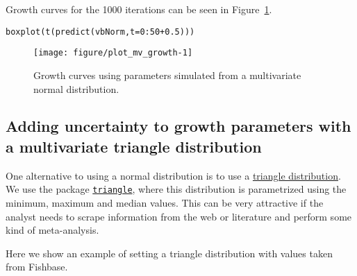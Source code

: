 \documentclass[a4paper,english,10pt]{article}\usepackage[]{graphicx}\usepackage[]{color}
\makeatletter
\def\maxwidth{ %
  \ifdim\Gin@nat@width>\linewidth
    \linewidth
  \else
    \Gin@nat@width
  \fi
}
\newcommand{\hlnum}[1]{\textcolor[rgb]{0.2,0.2,0.2}{#1}}%
\newcommand{\hlopt}[1]{\textcolor[rgb]{0.2,0.2,0.2}{#1}}%
\newcommand{\hlstd}[1]{\textcolor[rgb]{0,0,0}{#1}}%
\newcommand{\hlkwc}[1]{\textcolor[rgb]{0.361,0.506,0.596}{#1}}%
\newcommand{\hlkwd}[1]{\textcolor[rgb]{0.361,0.506,0.596}{#1}}%
\newenvironment{kframe}{%
 \def\at@end@of@kframe{}%
 \ifinner\ifhmode%
  \def\at@end@of@kframe{\end{minipage}}%
  \begin{minipage}{\columnwidth}%
 \fi\fi%
 \def\FrameCommand##1{\hskip\@totalleftmargin \hskip-\fboxsep
 \colorbox{shadecolor}{##1}\hskip-\fboxsep
     \hskip-\linewidth \hskip-\@totalleftmargin \hskip\columnwidth}%
 \MakeFramed {\advance\hsize-\width
   \@totalleftmargin\z@ \linewidth\hsize
   \@setminipage}}%
 {\par\unskip\endMakeFramed%
 \at@end@of@kframe}
\newenvironment{knitrout}{}{} %
\newcommand{\pkg}[1]{{\texttt{#1}}}
\makeatother
\begin{document}
Growth curves for the 1000 iterations can be seen in Figure~\ref{fig:plot_mv_growth}.

\begin{knitrout}
\color{fgcolor}\begin{kframe}
\begin{alltt}
\hlkwd{boxplot}\hlstd{(}\hlkwd{t}\hlstd{(}\hlkwd{predict}\hlstd{(vbNorm,} \hlkwc{t}\hlstd{=}\hlnum{0}\hlopt{:}\hlnum{50}\hlopt{+}\hlnum{0.5}\hlstd{)))}
\end{alltt}
\end{kframe}\begin{figure}[H]

{\centering \texttt{[image: figure/plot\_mv\_growth-1]} 

}

\caption[Growth curves using parameters simulated from a multivariate normal distribution]{Growth curves using parameters simulated from a multivariate normal distribution.}\label{fig:plot_mv_growth}
\end{figure}


\end{knitrout}

\subsection{Adding uncertainty to growth parameters with a multivariate triangle distribution}
\label{sec:growth_triangle_cop}

One alternative to using a normal distribution is to use a \href{http://en.wikipedia.org/wiki/Triangle\_distribution}{triangle distribution}. We use the package \href{http://cran.r-project.org/web/packages/triangle/index.html}{\pkg{triangle}}, where this distribution is parametrized using the minimum, maximum and median values. This can be very attractive if the analyst needs to scrape information from the web or literature and perform some kind of meta-analysis.

Here we show an example of setting a triangle distribution with values taken from Fishbase.
\end{document}
